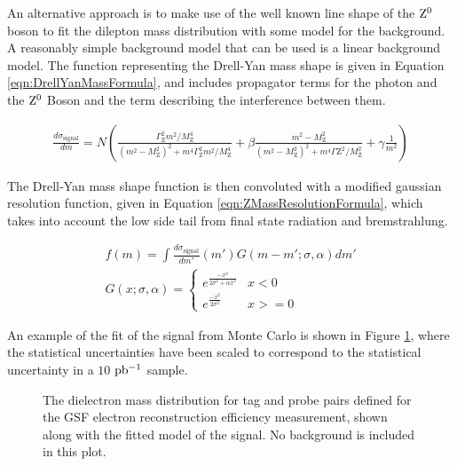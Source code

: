 \documentclass{cmspaper}
\begin{document}
\label{sec:MassFitMethod}
An alternative approach is to make use of the well known line shape of the $\mathrm{Z^0}$ boson to fit the dilepton mass distribution with some model for the background. A reasonably simple background model that can be used is a linear background model. The function representing the Drell-Yan mass shape is given in Equation \ref{eqn:DrellYanMassFormula}, and includes propagator terms for the photon and the $\mathrm{Z^0}$ Boson and the term describing the interference between them. 

\begin{eqnarray}
  \label{eqn:DrellYanMassFormula} 
\frac{d\sigma_{\mathrm{signal}}}{dm} = N \left(\frac{\Gamma_{\mathrm{Z}}^{2} m^{2}/M_{\mathrm{Z}}^4}{(m^{2} - M_{\mathrm{Z}}^{2})^{2} + m^{4} \Gamma_{\mathrm{Z}}^{2} m^{2}/M_{\mathrm{Z}}^4} + \beta\frac{m^{2} - M_{\mathrm{Z}}^{2}}{(m^{2} - M_{\mathrm{Z}}^{2})^{2} + m^{4}\Gamma{\mathrm{Z}}^{2}/M_{\mathrm{Z}}^{2}} + \gamma\frac{1}{m^{2}} \right)
\end{eqnarray}

The Drell-Yan mass shape function is then convoluted with a modified gaussian resolution function, given in Equation \ref{eqn:ZMassResolutionFormula}, which takes into account the low side tail from final state radiation and bremstrahlung. 

\begin{eqnarray}
  \label{eqn:ZMassResolutionFormula} 
f(m) = \int \frac{d\sigma_{\mathrm{signal}}}{dm'}(m')G(m-m';\sigma,\alpha) dm' \\
G(x;\sigma,\alpha) = 
\begin{cases}
  e^{\frac{-x^{2}}{2\sigma^{2}+\alpha x^{2}}}  & x < 0 \\
  e^{\frac{-x^{2}}{2\sigma^{2}}}  & x >= 0
\end{cases}
\end{eqnarray}

An example of the fit of the signal from Monte Carlo is shown in Figure \ref{fig:ZeeMassFit_SignalOnly}, where the statistical uncertainties have been scaled to correspond to the statistical uncertainty in a $10$ $\mathrm{pb^{-1}}$ sample. 

\begin{figure}[htb]
  \begin{center}    

    \caption{The dielectron mass distribution for tag and probe pairs defined for the GSF electron reconstruction efficiency measurement, shown along with the fitted model of the signal. No background is included in this plot. }
    \label{fig:ZeeMassFit_SignalOnly}
  \end{center}
\end{figure}
\end{document}
